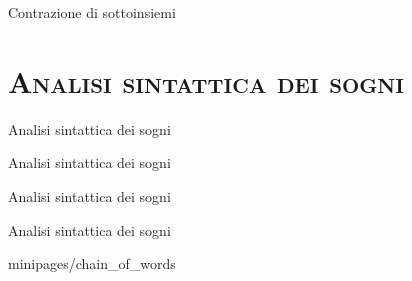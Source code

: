 \documentclass[xcolor=x11names,compress]{beamer}
\begin{document}
\begin{frame}[t]{Contrazione di sottoinsiemi}
    \vspace{-0.5cm}
    
    \begin{minipage}[t]{\textwidth}
        \centering
        
    \end{minipage}
\end{frame}

\section{\scshape Analisi sintattica dei sogni}
\begin{frame}[t]{Analisi sintattica dei sogni}
    \vspace{-0.2cm}
    
\end{frame}

\begin{frame}[t]{Analisi sintattica dei sogni}
    \vspace{-0.2cm}
    
\end{frame}

\begin{frame}[t]{Analisi sintattica dei sogni}
    \vspace{-0.2cm}
    
\end{frame}

\begin{frame}[t]{Analisi sintattica dei sogni}
    \vspace{-0.2cm}
    
    
     {minipages/chain_of_words}
\end{frame}
\end{document}
